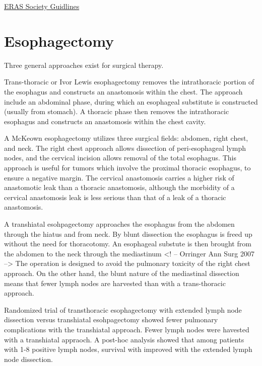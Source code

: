 \documentclass[
]{book}
\begin{document}
\href{https://www.ncbi.nlm.nih.gov/pmc/articles/PMC7098920/}{ERAS Society Guidlines}

\hypertarget{esophagectomy-1}{%
\chapter{Esophagectomy}\label{esophagectomy-1}}

Three general approaches exist for surgical therapy.

Trans-thoracic or Ivor Lewis esophagectomy\citep{visbal1803} removes the intrathoracic portion of the esophagus and constructs an anastomosis within the chest. The approach include an abdominal phase, during which an esophageal substitute is constructed (usually from stomach). A thoracic phase then removes the intrathoracic esophagus and constructs an anastomosis within the chest cavity.

A McKeown esophagectomy utilizes three surgical fields: abdomen, right chest, and neck. The right chest approach allows dissection of peri-esophageal lymph nodes, and the cervical incision allows removal of the total esophagus.\citep{mckeown259} This approach is useful for tumors which involve the proximal thoracic esophagus, to ensure a negative margin. The cervical anastomosis carries a higher risk of anastomotic leak than a thoracic anastomosis, although the morbidity of a cervical anastomosis leak is less serious than that of a leak of a thoracic anastomosis.

A transhiatal esohpagectomy approaches the esophagus from the abdomen through the hiatus and from neck. By blunt dissection the esophagus is freed up without the need for thoracotomy. An esophageal substute is then brought from the abdomen to the neck through the mediastinum\citep{orringer643} \citep{orringer363}\textless! -- Orringer Ann Surg 2007 --\textgreater{} The operation is designed to avoid the pulmonary toxicity of the right chest approach. On the other hand, the blunt nature of the mediastinal dissection means that fewer lymph nodes are harvested than with a trans-thoracic approach.

Randomized trial of transthoracic esophagectomy with extended lymph node dissection versus transhiatal esohpagectomy showed fewer pulmonary complications with the transhiatal approach. \citep{hulscher1662} Fewer lymph nodes were havested with a transhiatal appraoch. A post-hoc analysis showed that among patients with 1-8 positive lymph nodes, survival with improved with the extended lymph node dissection.\citep{omloo992}
\end{document}
